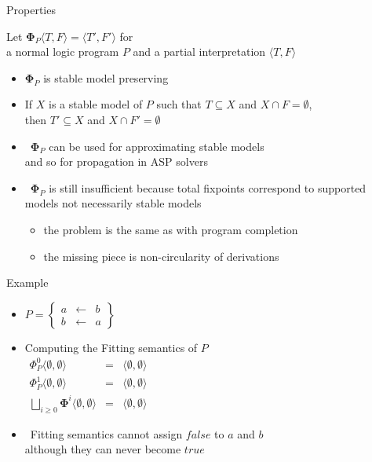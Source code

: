 \begin{frame}{Properties}

  Let ${\mathbf{\Phi}}_P\langle T,F \rangle=\langle T',F'\rangle$
  for\\
  a normal logic program $P$ and
  a partial interpretation $\langle T,F \rangle$
  \smallskip
  \begin{itemize}
  \item<2-> ${\mathbf{\Phi}}_P$ is \alert{stable model preserving}
  \item<2-> [] If $X$ is a stable model of $P$ such that $T\subseteq X$ and $X\cap F=\emptyset$,
    \\ then $T'\subseteq X$ and $X\cap F'=\emptyset$
    \smallskip
  \item<3->  \ ${\mathbf{\Phi}}_P$ can be used for approximating stable models
    \\ and so for propagation in ASP solvers
    \medskip
  \item <4->   \ ${\mathbf{\Phi}}_P$ is still insufficient because total fixpoints
    correspond to supported models not necessarily stable models
    \begin{itemize}\normalsize
    \item the problem is the same as with program completion
    \item the missing piece is non-circularity of derivations
    \end{itemize}
  \end{itemize}
\end{frame}
\begin{frame}{Example}
  \bigskip
  \begin{itemize}
  \item<1->
    \(
    P
    =
    \left\{
      \begin{array}{lcl}
        a &\leftarrow & b \\
        b &\leftarrow & a
      \end{array}
    \right\}
    \)
    \bigskip
  \item<2-> Computing the Fitting semantics of $P$
    \\
    \medskip
    \(
    \begin{array}{lcl}
      \Phi_P^0\langle \emptyset,\emptyset\rangle &=&\langle \emptyset,\emptyset\rangle\\
      \Phi_P^1\langle \emptyset,\emptyset\rangle &=&\langle \emptyset,\emptyset\rangle
      \\[5pt]
      \bigsqcup_{i \geq 0}\mathbf{\Phi}^i\langle\emptyset,\emptyset\rangle&=&\langle\emptyset,\emptyset\rangle
    \end{array}
    \)
    \bigskip
  \item<3->  \
    Fitting semantics cannot assign $\mathit{false}$ to $a$ and $b$
    \\
    although they can never become $\mathit{true}$
  \end{itemize}
\end{frame}
